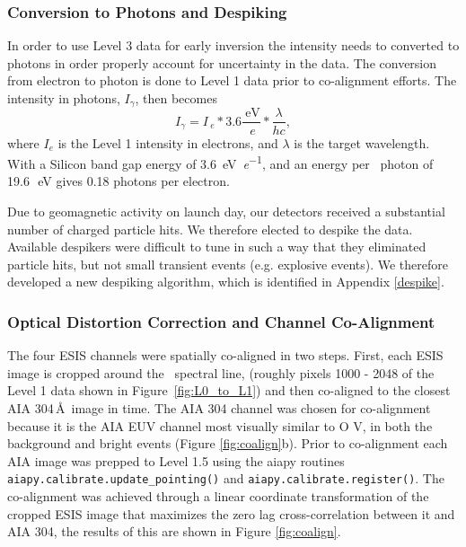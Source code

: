     
\subsubsection{Conversion to Photons and Despiking}
In order to use Level 3 data for early inversion the intensity needs to  converted to photons in order properly account for uncertainty in the data.
The conversion from electron to photon is done to Level 1 data prior to co-alignment efforts.
The intensity in photons, $I_{\gamma}$, then becomes
\begin{equation}
  I_{\gamma} = I_{\SI{}{\elementarycharge}} * 3.6 \frac{\SI{}{\electronvolt}}{\SI{}{\elementarycharge}} * \frac{\lambda}{hc},
\end{equation}
where $I_e$ is the Level 1 intensity in electrons, and $\lambda$ is the target wavelength.
With a Silicon band gap energy of \SI[per-mode=symbol]{3.6}{\electronvolt\per\elementarycharge}, and an energy per \ov \ photon 
of 19.6\,\SI{}{\electronvolt} gives 0.18 photons per electron.


Due to geomagnetic activity on launch day, our detectors received a substantial number of charged particle hits. 
We therefore elected to despike the data.
Available despikers were difficult to tune in such a way that they eliminated particle hits, but not small transient events (e.g. explosive events). We therefore developed a new despiking algorithm, which is identified in Appendix \ref{despike}.

        
\subsubsection{Optical Distortion Correction and Channel Co-Alignment}
   
  The four ESIS channels were spatially co-aligned in two steps.
First, each ESIS image is cropped around the \ov \ spectral line, (roughly pixels 1000 - 2048 of the Level 1 data shown in Figure~\ref{fig:L0_to_L1}) and then co-aligned to the closest AIA 304\,\AA\ image in time.  
The AIA 304 channel was chosen for co-alignment because it is the AIA EUV channel most visually similar to O V, in both the background and bright events (Figure \ref{fig:coalign}b).
Prior to co-alignment each AIA image was prepped to Level 1.5 using the aiapy routines \texttt{aiapy.calibrate.update\_pointing()} and \texttt{aiapy.calibrate.register()}.
The co-alignment was achieved through a linear coordinate transformation of the cropped ESIS image that maximizes the zero lag cross-correlation between it and AIA 304, the results of this are shown in Figure \ref{fig:coalign}.

